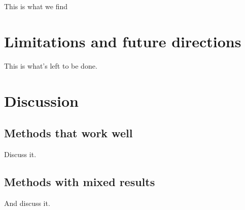 \documentclass[a4paper,man,floatsintext,natbib]{apa6}\usepackage[]{graphicx}\usepackage[]{xcolor}
\newcommand{\pathBIB}{./bib}
\begin{document}
	This is what we find
    
\section{Limitations and future directions}

	This is what's left to be done.
    
\section{Discussion}

\subsection{Methods that work well}

	Discuss it.

\subsection{Methods with mixed results}

	And discuss it.
    
    \setcounter{secnumdepth}{4}

    



\end{document}
